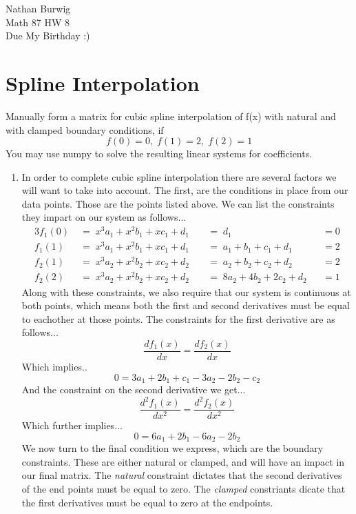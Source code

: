 \documentclass[11pt]{article}
\begin{document}
    \noindent Nathan Burwig \\
    Math 87 HW 8 \\
    Due My Birthday :)
    
    \hrulefill
    
    \section{Spline Interpolation}
    
    Manually form a matrix for cubic spline interpolation of f(x) with natural 
    and with clamped boundary conditions, if
    \[
        f(0) = 0,\; f(1) = 2,\; f(2) = 1
    \]
    You may use numpy to solve the resulting linear systems for coefficients.

    \begin{enumerate}
        \item In order to complete cubic spline interpolation there are several
            factors we will want to take into account. The first, are the
            conditions in place from our data points. Those are the points
            listed above. We can list the constraints they impart on our system
            as follows...
            \begin{alignat}{3}
                f_1(0) \;&=\; x^3a_1 + x^2b_1 + xc_1 + d_1 \;&&=\; d_1 & &= 0  \\
                f_1(1) \;&=\; x^3a_1 + x^2b_1 + xc_1 + d_1 \;&&=\; a_1 + b_1 + c_1 + d_1 & &= 2 \\
                f_2(1) \;&=\; x^3a_2 + x^2b_2 + xc_2 + d_2 \;&&=\; a_2 + b_2 + c_2 + d_2 & &= 2 \\
                f_2(2) \;&=\; x^3a_2 + x^2b_2 + xc_2 + d_2 \;&&=\; 8a_2 + 4b_2 + 2c_2 + d_2 & &= 1 
            \end{alignat}
            Along with these constraints, we also require that our system is
            continuous at both points, which means both the first and second
            derivatives must be equal to eachother at those points. The
            constraints for the first derivative are as follows...
            \[
                \frac{df_1(x)}{dx} = \frac{df_2(x)}{dx}
            \]
            Which implies..
            \begin{equation}
                0 = 3a_1 + 2b_1 + c_1 - 3a_2 - 2b_2 - c_2  
            \end{equation}
            And the constraint on the second derivative we get...
            \[
                \frac{d^2f_1(x)}{dx^2} = \frac{d^2f_2(x)}{dx^2} 
            \]
            Which further implies...
            \begin{equation}
                0 = 6a_1 + 2b_1 - 6a_2 - 2b_2
            \end{equation}
            We now turn to the final condition we express, which are the
            boundary constraints. These are either natural or clamped, and will
            have an impact in our final matrix. The \textit{natural} constraint dictates
            that the second derivatives of the end points must be equal to
            zero. The \textit{clamped} constriants dicate that the first
            derivatives must be equal to zero at the endpoints.


\end{enumerate}
\end{document}
